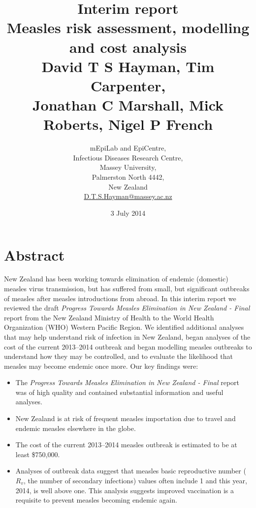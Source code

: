\documentclass{article}
\begin{document}


\title{Interim report\\ Measles risk assessment, modelling and cost analysis\\ \vspace{2 mm} {\large David T S Hayman, Tim Carpenter,\\ Jonathan C Marshall, Mick Roberts, Nigel P French}}
\author{mEpiLab and EpiCentre,\\ Infectious Diseases Research Centre,\\
Massey University,\\
Palmerston North 4442,\\
New Zealand\\
\href{mailto: D.T.S.Hayman@massey.ac.nz}{D.T.S.Hayman@massey.ac.nz}}  %
\date{3 July 2014}  %
\maketitle

\section{Abstract}

New Zealand has been working towards elimination of endemic (domestic) measles virus transmission, but has suffered from small, but significant outbreaks of measles after measles introductions from abroad. In this interim report we reviewed the draft \emph {Progress Towards Measles Elimination in New Zealand - Final} report from the New Zealand Ministry of Health to the World Health Organization (WHO) Western Pacific Region. We identified additional analyses that may help understand risk of infection in New Zealand, began analyses of the cost of the current 2013--2014 outbreak and began modelling measles outbreaks to understand how they may be controlled, and to evaluate the likelihood that measles may become endemic once more. Our key findings were:
\begin{itemize}
\item The \emph {Progress Towards Measles Elimination in New Zealand - Final} report was of high quality and contained substantial information and useful analyses.
\item New Zealand is at risk of frequent measles importation due to travel and endemic measles elsewhere in the globe.
\item The cost of the current 2013--2014 measles outbreak is estimated to be at least \$750,000.
\item Analyses of outbreak data suggest that measles basic reproductive number ($R_v$, the number of secondary infections) values often include 1 and this year, 2014, is well above one. This analysis suggests improved vaccination is a requisite to prevent measles becoming endemic again.
\end{itemize}
\end{document}
